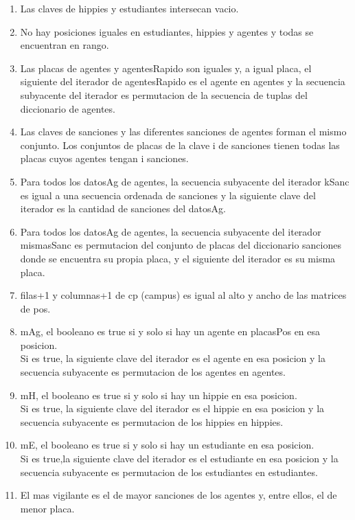 \begin{Representacion}
	\begin{enumerate}
		\item Las claves de hippies y estudiantes intersecan vacio.
		\item No hay posiciones iguales en estudiantes, hippies y agentes y todas se encuentran en rango.
		\item Las placas de agentes y agentesRapido son iguales y, a igual placa, el siguiente del iterador de agentesRapido es el agente en agentes y la secuencia subyacente del iterador es permutacion de la secuencia de tuplas del diccionario de agentes.
		\item Las claves de sanciones y las diferentes sanciones de agentes forman el mismo conjunto. Los conjuntos de placas de la clave i de sanciones tienen todas las placas cuyos agentes tengan i sanciones.
		\item Para todos los datosAg de agentes, la secuencia subyacente del iterador kSanc es igual a una secuencia ordenada de sanciones y la siguiente clave del iterador es la cantidad de sanciones del datosAg.
		\item Para todos los datosAg de agentes, la secuencia subyacente del iterador mismasSanc es permutacion del conjunto de placas del diccionario sanciones donde se encuentra su propia placa, y el siguiente del iterador es su misma placa.
		\item filas+1 y columnas+1 de cp (campus) es igual al alto y ancho de las matrices de pos.
		\item mAg, el booleano es true si y solo si hay un agente en placasPos en esa posicion.\\
		Si es true, la siguiente clave del iterador es el agente en esa posicion y la secuencia subyacente es permutacion de los agentes en agentes.
		\item mH, el booleano es true si y solo si hay un hippie en esa posicion.\\
		Si es true, la siguiente clave del iterador es el hippie en esa posicion y la secuencia subyacente es permutacion de los hippies en hippies.
		\item mE, el booleano es true si y solo si hay un estudiante en esa posicion.\\
		Si es true,la siguiente clave del iterador es el estudiante en esa posicion y la secuencia subyacente es permutacion de los estudiantes en estudiantes.
		\item El mas vigilante es el de mayor sanciones de los agentes y, entre ellos, el de menor placa.
	\end{enumerate}
	

\end{Representacion}
